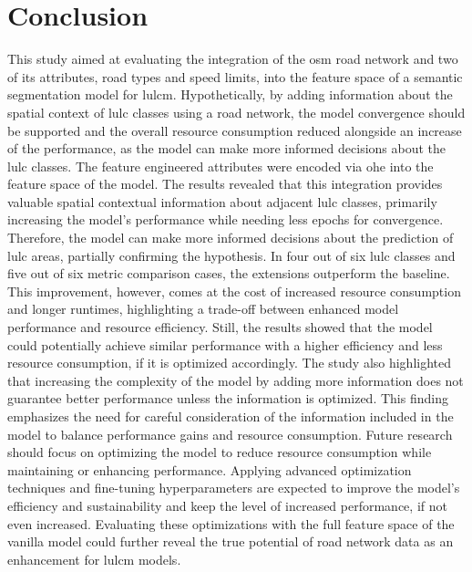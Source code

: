 \chapter{Conclusion}
\label{sec:conclusion}

This study aimed at evaluating the integration of the \gls{osm} road network and two of its attributes, road types and speed limits, into the feature space of a semantic segmentation model for \gls{lulcm}. Hypothetically, by adding information about the spatial context of \gls{lulc} classes using a road network, the model convergence should be supported and the overall resource consumption reduced alongside an increase of the performance, as the model can make more informed decisions about the \gls{lulc} classes. The feature engineered attributes were encoded via \gls{ohe} into the feature space of the model. The results revealed that this integration provides valuable spatial contextual information about adjacent \gls{lulc} classes, primarily increasing the model's performance while needing less epochs for convergence. Therefore, the model can make more informed decisions about the prediction of \gls{lulc} areas, partially confirming the hypothesis. In four out of six \gls{lulc} classes and five out of six metric comparison cases, the extensions outperform the baseline. This improvement, however, comes at the cost of increased resource consumption and longer runtimes, highlighting a trade-off between enhanced model performance and resource efficiency. Still, the results showed that the model could potentially achieve similar performance with a higher efficiency and less resource consumption, if it is optimized accordingly. The study also highlighted that increasing the complexity of the model by adding more information does not guarantee better performance unless the information is optimized. This finding emphasizes the need for careful consideration of the information included in the model to balance performance gains and resource consumption. Future research should focus on optimizing the model to reduce resource consumption while maintaining or enhancing performance. Applying advanced optimization techniques and fine-tuning hyperparameters are expected to improve the model's efficiency and sustainability and keep the level of increased performance, if not even increased. Evaluating these optimizations with the full feature space of the vanilla model could further reveal the true potential of road network data as an enhancement for \gls{lulcm} models.

